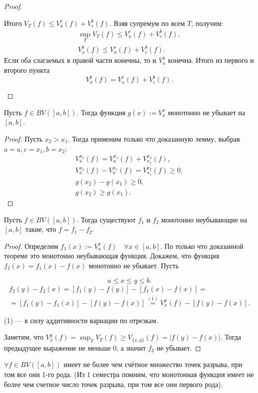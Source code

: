 \begin{proof}
\begin{itemize}
        Итого $V_T(f) \leqslant V_a^c(f)+V_c^b(f)$. Взяв супремум по всем $T$, получим:
        $$
        \begin{gathered}
        \sup _T V_T(f) \leqslant V_a^c(f)+V_c^b(f), \\
        V_a^b(f) \leqslant V_a^c(f)+V_c^b(f).
        \end{gathered}
        $$
        Если оба слагаемых в правой части конечны, то и $V_a^b$ конечна. Итого из первого и второго пункта
        $$
        V_a^b(f)=V_a^c(f)+V_c^b(f).
        $$
    \end{itemize}
\end{proof} 

\begin{theorem}
    Пусть $f \in B V([a, b])$. Тогда функция $g(x):=V_a^x$ монотонно не убывает на $[a, b]$. 
\end{theorem}
\begin{proof}
    Пусть $x_2>x_1$. Тогда применим только что доказанную лемму, выбрав $a= a, c=x_1, b=x_2$:
    $$
    \begin{gathered}
    V_a^{x_2}(f)=V_a^{x_1}(f)+V_{x_1}^{x_2}(f), \\
    V_a^{x_2}(f)-V_a^{x_1}(f)=V_{x_1}^{x_2}(f) \geqslant 0, \\
    g\left(x_2\right)-g\left(x_1\right) \geqslant 0, \\
    g\left(x_2\right) \geqslant g\left(x_1\right).
    \end{gathered}
    $$
\end{proof} 

\begin{theorem}
    Пусть $f \in B V([a, b])$. Тогда существуют $f_1$ и $f_2$ монотонно неубывающие на $[a, b]$ такие, что $f=f_1-f_2$.
\end{theorem} 
\begin{proof}
    Определим $f_1(x):=V_a^x(f) \quad \forall x \in[a, b]$. По только что доказанной теореме это монотонно неубывающая функция.
    Докажем, что функция $f_2(x)=f_1(x)-f(x)$ монотонно не убывает. Пусть

    $$a \leqslant x \leqslant y \leqslant b.$$ 
    \begin{multline*}
        f_2(y)-f_2(x)=\left[f_1(y)-f(y)\right]-\left[f_1(x)-f(x)\right] =\\=\left[f_1(y)-f_1(x)\right]-[f(y)-f(x)] \stackrel{(1)}{=} V_x^y(f)-[f(y)-f(x)].
    \end{multline*} 

    (1) — в силу аддитивности вариации по отрезкам.

    Заметим, что $V_x^y(f)=\sup_T V_T(f) \geqslant V_{\{x, y\}}(f)=|f(y)-f(x)|$. Тогда предыдущее выражение не меньше 0, а значит $f_2$ не убывает.
\end{proof} 
\begin{corollary}
    $\forall f \in B V([a, b])$ имеет не более чем счётное множество точек разрыва, при том все они 1-го рода. (Из 1 семестра помним, что монотонная функция имеет не более чем счетное число точек разрыва, при том все они первого рода).
\end{corollary}


